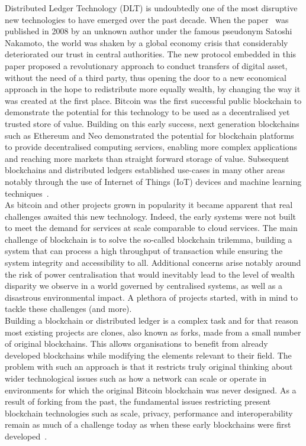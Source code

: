 Distributed Ledger Technology (DLT) is undoubtedly one of the most disruptive new  technologies to have emerged over the past decade. When the paper~\cite{nakamoto} was published in 2008 by an unknown author under the famous pseudonym Satoshi Nakamoto, the world was shaken by a global economy crisis that considerably deteriorated our trust in central authorities. The new protocol embedded in this paper proposed a revolutionary approach to conduct transfers of digital asset, without the need of a third party, thus opening the door to a new economical approach in the hope to redistribute more equally wealth, by changing the way it was created at the first place. Bitcoin was the first successful public blockchain to demonstrate the potential for this technology to be used as a decentralised yet trusted store of value. Building on this early success, next generation blockchains such as Ethereum and Neo demonstrated the potential for blockchain platforms to provide decentralised computing services, enabling more complex applications and reaching more markets than straight forward storage of value. Subsequent blockchains and distributed ledgers established use-cases in many other areas notably through the use of Internet of Things (IoT) devices and machine learning techniques~\cite{govuk}.\\

As bitcoin and other projects grown in popularity it became apparent that real challenges awaited this new technology. Indeed, the early systems were not built to meet the demand for services at scale comparable to cloud services. The main challenge of blockchain is to solve the so-called blockchain trilemma, building a system that can process a high throughput of transaction while ensuring the system integrity and accessibility to all. Additional concerns arise notably around the risk of power centralisation that would inevitably lead to the level of wealth disparity we observe in a world governed by centralised systems, as well as a disastrous environmental impact. A plethora of projects started, with in mind to tackle these challenges (and more).\\

Building a blockchain or distributed ledger is a complex task and for that reason most existing projects are clones, also known as forks, made from a small number of original blockchains. This allows organisations to benefit from already developed blockchains while modifying the elements relevant to their field. The problem with such an approach is that it restricts truly original thinking about wider technological issues such as how a network can scale or operate in environments for which the original Bitcoin blockchain was never designed. As a result of forking from the past, the fundamental issues restricting present blockchain technologies such as scale, privacy, performance and interoperability remain as much of a challenge today as when these early blockchains were first developed~\cite{obst}.\\

